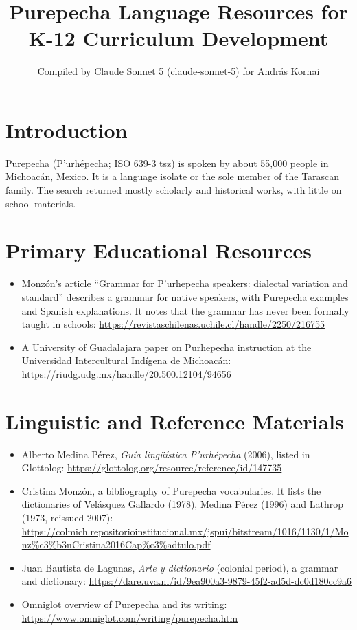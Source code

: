 \documentclass[12pt]{article}
\title{Purepecha Language Resources for K-12 Curriculum Development}
\author{Compiled by Claude Sonnet 5 (claude-sonnet-5) for Andr\'as Kornai}
\date{}
\begin{document}
\maketitle

\section{Introduction}
Purepecha (P'urh\'epecha; ISO 639-3 tsz) is spoken by about 55,000 people in Michoac\'an, Mexico. It is a language isolate or the sole member of the Tarascan family. The search returned mostly scholarly and historical works, with little on school materials.

\section{Primary Educational Resources}
\begin{itemize}
\item Monz\'on's article ``Grammar for P'urhepecha speakers: dialectal variation and standard'' describes a grammar for native speakers, with Purepecha examples and Spanish explanations. It notes that the grammar has never been formally taught in schools: \url{https://revistaschilenas.uchile.cl/handle/2250/216755}
\item A University of Guadalajara paper on Purhepecha instruction at the Universidad Intercultural Ind\'igena de Michoac\'an: \url{https://riudg.udg.mx/handle/20.500.12104/94656}
\end{itemize}

\section{Linguistic and Reference Materials}
\begin{itemize}
\item Alberto Medina P\'erez, \emph{Gu\'ia ling\"u\'istica P'urh\'epecha} (2006), listed in Glottolog: \url{https://glottolog.org/resource/reference/id/147735}
\item Cristina Monz\'on, a bibliography of Purepecha vocabularies. It lists the dictionaries of Vel\'asquez Gallardo (1978), Medina P\'erez (1996) and Lathrop (1973, reissued 2007): \url{https://colmich.repositorioinstitucional.mx/jspui/bitstream/1016/1130/1/Monz%c3%b3nCristina2016Cap%c3%adtulo.pdf}
\item Juan Bautista de Lagunas, \emph{Arte y dictionario} (colonial period), a grammar and dictionary: \url{https://dare.uva.nl/id/9ea900a3-9879-45f2-ad5d-dc0d180cc9a6}
\item Omniglot overview of Purepecha and its writing: \url{https://www.omniglot.com/writing/purepecha.htm}
\end{itemize}
\end{document}
